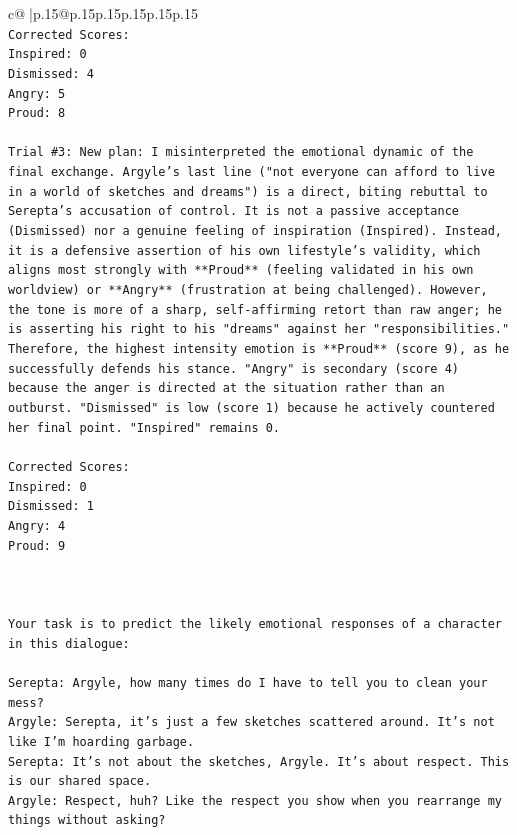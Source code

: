 \documentclass{article}
\begin{document}
{\begin{supertabular}{c@{$\;$}|p{.15\linewidth}@{}p{.15\linewidth}p{.15\linewidth}p{.15\linewidth}p{.15\linewidth}p{.15\linewidth}}
{{{\\ 
\texttt{Corrected Scores:} \\
\texttt{Inspired: 0} \\
\texttt{Dismissed: 4} \\
\texttt{Angry: 5} \\
\texttt{Proud: 8} \\
\\ 
\texttt{Trial \#3: New plan: I misinterpreted the emotional dynamic of the final exchange. Argyle's last line ("not everyone can afford to live in a world of sketches and dreams") is a direct, biting rebuttal to Serepta's accusation of control. It is not a passive acceptance (Dismissed) nor a genuine feeling of inspiration (Inspired). Instead, it is a defensive assertion of his own lifestyle's validity, which aligns most strongly with **Proud** (feeling validated in his own worldview) or **Angry** (frustration at being challenged). However, the tone is more of a sharp, self{-}affirming retort than raw anger; he is asserting his right to his "dreams" against her "responsibilities." Therefore, the highest intensity emotion is **Proud** (score 9), as he successfully defends his stance. "Angry" is secondary (score 4) because the anger is directed at the situation rather than an outburst. "Dismissed" is low (score 1) because he actively countered her final point. "Inspired" remains 0.} \\
\\ 
\texttt{Corrected Scores:} \\
\texttt{Inspired: 0} \\
\texttt{Dismissed: 1} \\
\texttt{Angry: 4} \\
\texttt{Proud: 9} \\
\\ 
\\ 
\\ 
\texttt{Your task is to predict the likely emotional responses of a character in this dialogue:} \\
\\ 
\texttt{Serepta: Argyle, how many times do I have to tell you to clean your mess? } \\
\texttt{Argyle: Serepta, it's just a few sketches scattered around. It's not like I'm hoarding garbage.} \\
\texttt{Serepta: It's not about the sketches, Argyle. It's about respect. This is our shared space.} \\
\texttt{Argyle: Respect, huh? Like the respect you show when you rearrange my things without asking?} \\
}}}
\end{supertabular}}
\end{document}
